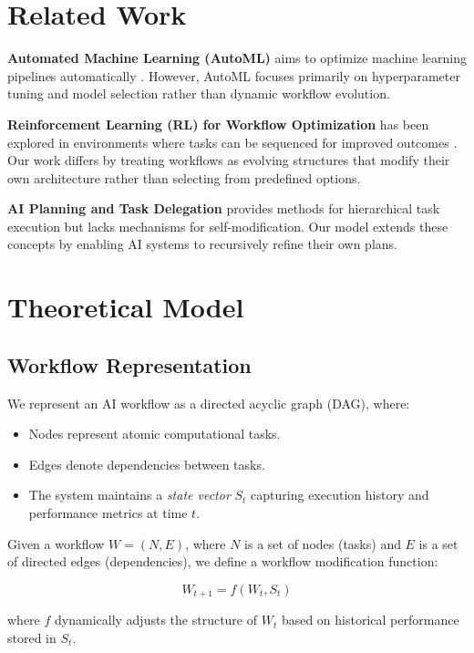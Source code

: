 \documentclass{article}
\begin{document}
\section{Related Work}

\textbf{Automated Machine Learning (AutoML)} aims to optimize machine learning pipelines automatically \cite{hutter2019automl}. However, AutoML focuses primarily on hyperparameter tuning and model selection rather than dynamic workflow evolution.

\textbf{Reinforcement Learning (RL) for Workflow Optimization} has been explored in environments where tasks can be sequenced for improved outcomes \cite{li2020reinforcement}. Our work differs by treating workflows as evolving structures that modify their own architecture rather than selecting from predefined options.

\textbf{AI Planning and Task Delegation} \cite{ghallab2004automated} provides methods for hierarchical task execution but lacks mechanisms for self-modification. Our model extends these concepts by enabling AI systems to recursively refine their own plans.

\section{Theoretical Model}

\subsection{Workflow Representation}

We represent an AI workflow as a directed acyclic graph (DAG), where:
\begin{itemize}
    \item Nodes represent atomic computational tasks.
    \item Edges denote dependencies between tasks.
    \item The system maintains a \emph{state vector} $S_t$ capturing execution history and performance metrics at time $t$.
\end{itemize}

Given a workflow $W = (N, E)$, where $N$ is a set of nodes (tasks) and $E$ is a set of directed edges (dependencies), we define a workflow modification function:

\begin{equation}
    W_{t+1} = f(W_t, S_t)
\end{equation}

where $f$ dynamically adjusts the structure of $W_t$ based on historical performance stored in $S_t$.
\end{document}
